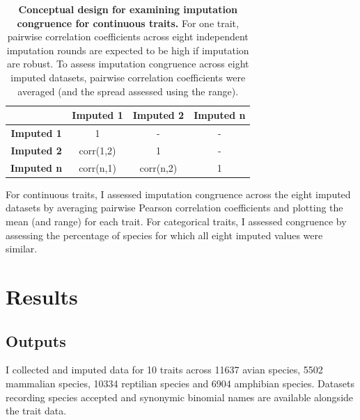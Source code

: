 \begin{table}[h!]
\renewcommand{\baselinestretch}{1}
\renewcommand{\arraystretch}{1.5}
\begin{center}\fontsize{9}{11}\selectfont
\caption[Conceptual design for examining imputation congruence for continuous traits]{\textbf{Conceptual design for examining imputation congruence for continuous traits.} For one trait, pairwise correlation coefficients across eight independent imputation rounds are expected to be high if imputation are robust. To assess imputation congruence across eight imputed datasets, pairwise correlation coefficients were averaged (and the spread assessed using the range).} 
\label{pairwisecorr}
 \begin{tabular}{c|c|c|c|}
\cline{2-4}
\multicolumn{1}{l|}{}                    & \textbf{Imputed 1} & \textbf{Imputed 2} & \textbf{Imputed n} \\ \hline
\multicolumn{1}{|c|}{\textbf{Imputed 1}} & 1                  & -                  & -                  \\ \hline
\multicolumn{1}{|c|}{\textbf{Imputed 2}} & corr(1,2)          & 1                  & -                  \\ \hline
\multicolumn{1}{|c|}{\textbf{Imputed n}} & corr(n,1)          & corr(n,2)          & 1                  \\ \hline
\end{tabular}
\end{center}
\end{table}


For continuous traits, I assessed imputation congruence across the eight imputed datasets by averaging pairwise Pearson correlation coefficients and plotting the mean (and range) for each trait. For categorical traits, I assessed congruence by assessing the percentage of species for which all eight imputed values were similar.

\section{Results}

\subsection{Outputs}
I collected and imputed data for 10 traits across 11637 avian species, 5502 mammalian species, 10334 reptilian species and 6904 amphibian species. Datasets recording species accepted and synonymic binomial names are available alongside the trait data. 

